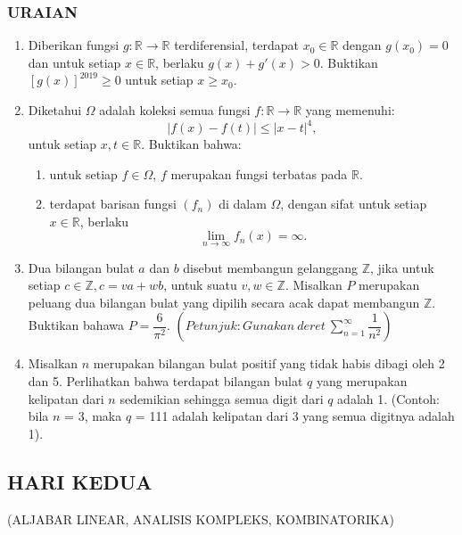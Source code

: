 \documentclass[12pt,twoside]{article}
\begin{document}
\newpage \subsubsection*{URAIAN}
\begin{enumerate}
	\item Diberikan fungsi $g : \mathbb{R} \rightarrow \mathbb{R}$ terdiferensial, terdapat $x_0 \in \mathbb{R}$ dengan $g\left(x_0\right)=0$ dan untuk setiap $x \in \mathbb{R}$, berlaku $g\left(x\right)+g'\left(x\right)>0$. Buktikan $\left[g\left(x\right)\right]^{2019} \geq 0$ untuk setiap $x \geq x_0$.

	\item Diketahui $\Omega$ adalah koleksi semua fungsi $f : \mathbb{R} \rightarrow \mathbb{R}$ yang memenuhi:
	      $$\left|f\left(x\right)-f\left(t\right)\right| \leq \left|x-t\right|^4,$$
	      untuk setiap $x,t \in \mathbb{R}$. Buktikan bahwa:
	      \begin{enumerate}
		      \item[(i)] untuk setiap $f \in \Omega$, $f$ merupakan fungsi terbatas pada $\mathbb{R}$.
		      \item[(ii)] terdapat barisan fungsi $\left(f_n\right)$ di dalam $\Omega$, dengan sifat untuk setiap $x \in \mathbb{R}$, berlaku
		            $$\lim_{n\rightarrow\infty} f_n\left(x\right)=\infty.$$
	      \end{enumerate}

	\item Dua bilangan bulat $a$ dan $b$ disebut membangun gelanggang $\mathbb{Z}$, jika untuk setiap $c \in \mathbb{Z}, c = va+wb$, untuk suatu $v,w \in \mathbb{Z}$. Misalkan $P$ merupakan peluang dua bilangan bulat yang dipilih secara acak dapat membangun $\mathbb{Z}$. Buktikan bahawa $P=\dfrac{6}{\pi^2}$. $\displaystyle\left(Petunjuk : Gunakan \ deret \ \sum_{n=1}^{\infty} \dfrac{1}{n^2}\right)$

	\item Misalkan $n$ merupakan bilangan bulat positif yang tidak habis dibagi oleh 2 dan 5. Perlihatkan bahwa terdapat bilangan bulat $q$ yang merupakan kelipatan dari $n$ sedemikian sehingga semua digit dari $q$ adalah 1. (Contoh: bila $n$ = 3, maka $q$ = 111 adalah kelipatan dari 3 yang semua digitnya adalah 1).
\end{enumerate}

\newpage
\subsection{HARI KEDUA}
\begin{center}
	(ALJABAR LINEAR, ANALISIS KOMPLEKS, KOMBINATORIKA)
\end{center}
\end{document}
